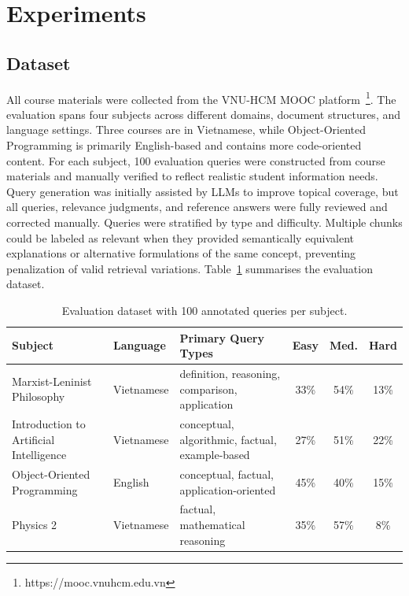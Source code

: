\documentclass[runningheads]{llncs}
\begin{document}
\FloatBarrier
\section{Experiments}
\label{expeval}

\subsection{Dataset}

All course materials were collected from the VNU-HCM MOOC platform~\footnote{https://mooc.vnuhcm.edu.vn}. The evaluation spans four subjects across different domains, document structures, and language settings. Three courses are in Vietnamese, while Object-Oriented Programming is primarily English-based and contains more code-oriented content. For each subject, 100 evaluation queries were constructed from course materials and manually verified to reflect realistic student information needs. Query generation was initially assisted by LLMs to improve topical coverage, but all queries, relevance judgments, and reference answers were fully reviewed and corrected manually. Queries were stratified by type and difficulty. Multiple chunks could be labeled as relevant when they provided semantically equivalent explanations or alternative formulations of the same concept, preventing penalization of valid retrieval variations. Table~\ref{tab:dataset} summarises the evaluation dataset.

\begin{table}[ht]
\caption{Evaluation dataset with 100 annotated queries per subject.}
\label{tab:dataset}
\centering
\begin{tabular}{|p{3cm}|l|p{4.5cm}|c|c|c|}
\hline
\textbf{Subject} & \textbf{Language} & \textbf{Primary Query Types} & \textbf{Easy} & \textbf{Med.} & \textbf{Hard} \\
\hline

Marxist-Leninist Philosophy
& Vietnamese
& definition, reasoning, comparison, application
& 33\%
& 54\%
& 13\% \\
\hline

Introduction to Artificial Intelligence
& Vietnamese
& conceptual, algorithmic, factual, example-based
& 27\%
& 51\%
& 22\% \\
\hline

Object-Oriented Programming
& English
& conceptual, factual, application-oriented
& 45\%
& 40\%
& 15\% \\
\hline

Physics 2
& Vietnamese
& factual, mathematical reasoning
& 35\%
& 57\%
& 8\% \\
\hline

\end{tabular}
\end{table}
\end{document}
